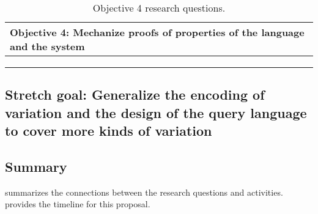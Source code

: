 \begin{table}
\caption{Objective 4 research questions.}
\label{tab:ro4}
\centering
\begin{tabularx}{\textwidth}{X}
\toprule
 \textbf{Objective 4: Mechanize proofs of properties of the language and the system}
\tabularnewline
\midrule
\tabularnewline[0.2cm]
\tabularnewline[0.2cm]

\tabularnewline
\bottomrule
\end{tabularx}
\end{table}


\subsection{Stretch goal: Generalize the encoding of variation and the design of the query 
language to cover more kinds of variation}
\label{sec:ro5}



\subsection{Summary}
\label{sec:sum}

 summarizes the connections between the research questions and activities.
 provides the timeline for this proposal.

\begin{figure}
\label{fig:conn}
\end{figure}

\begin{table}
\label{tab:timeline}
\end{table}

